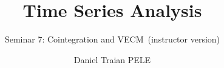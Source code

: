 \title[Time Series Analysis]{Time Series Analysis}
\subtitle{Seminar 7: Cointegration and VECM\ifsolutions\ (instructor version)\fi}
\author[D.T. Pele]{Daniel Traian PELE}
\date{}

\providecommand{\tsaapplink}[3]{\hypertarget{#2}{}\hyperlink{#1}{\beamergotobutton{#3}}}  %
\providecommand{\tsaappback}[2]{\begin{tikzpicture}[remember picture,overlay]\node[anchor=south east] at ([xshift=-3mm,yshift=7mm]current page.south east){\hyperlink{#1}{\beamerreturnbutton{#2}}};\end{tikzpicture}}  %
\providecommand{\tsachlink}[2]{\href{#1}{#2}}  %
\providecommand{\tsachlinkt}[2]{\href{#1}{\usebeamercolor[fg]{frametitle}#2}}  %


